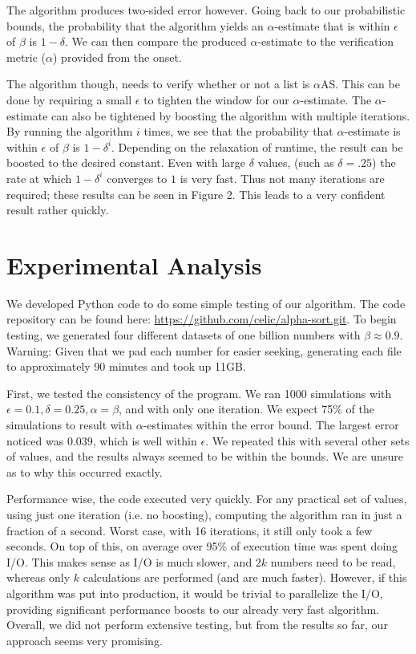 \documentclass[11pt]{article}
\begin{document}
The algorithm produces two-sided error however. Going back to our probabilistic bounds, the probability that the algorithm yields an $\alpha$-estimate that is within $\epsilon$ of $\beta$ is $1 - \delta$. We can then compare the produced $\alpha$-estimate to the verification metric ($\alpha$) provided from the onset. 

The algorithm though, needs to verify whether or not a list is $\alpha$AS. This can be done by requiring a small $\epsilon$ to tighten the window for our $\alpha$-estimate. The $\alpha$-estimate can also be tightened by boosting the algorithm with multiple iterations. By running the algorithm $i$ times, we see that the probability that $\alpha$-estimate is within $\epsilon$ of $\beta$ is $1 - \delta^i$. Depending on the relaxation of runtime, the result can be boosted to the desired constant. Even with large $\delta$ values, (such as $\delta = .25$) the rate at which $1 - \delta^i$ converges to $1$ is very fast. Thus not many iterations are required; these results can be seen in Figure 2. This leads to a very confident result rather quickly.

\section{Experimental Analysis}

We developed Python code to do some simple testing of our algorithm. The code repository can be found here: \url{https://github.com/celic/alpha-sort.git}. To begin testing, we generated four different datasets of one billion numbers with $\beta \approx 0.9$. Warning: Given that we pad each number for easier seeking, generating each file to approximately 90 minutes and took up 11GB. 

First, we tested the consistency of the program. We ran 1000 simulations with $\epsilon=0.1, \delta=0.25, \alpha=\beta$, and with only one iteration. We expect 75\% of the simulations to result with $\alpha$-estimates within the error bound. The largest error noticed was $0.039$, which is well within $\epsilon$. We repeated this with several other sets of values, and the results always seemed to be within the bounds. We are unsure as to why this occurred exactly.

Performance wise, the code executed very quickly. For any practical set of values, using just one iteration (i.e. no boosting), computing the algorithm ran in just a fraction of a second. Worst case, with 16 iterations, it still only took a few seconds. On top of this, on average over 95\% of execution time was spent doing I/O. This makes sense as I/O is much slower, and $2k$ numbers need to be read, whereas only $k$ calculations are performed (and are much faster). However, if this algorithm was put into production, it would be trivial to parallelize the I/O, providing significant performance boosts to our already very fast algorithm. Overall, we did not perform extensive testing, but from the results so far, our approach seems very promising.
\end{document}
